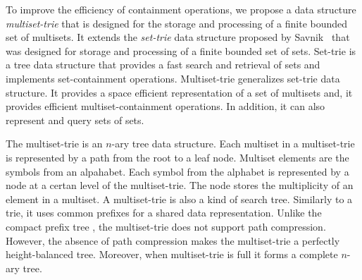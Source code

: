%
%
To improve the efficiency of containment operations, we propose a data structure \emph{multiset-trie} that is designed for the storage and processing of a finite bounded set of multisets. It extends the \emph{set-trie} data structure proposed by Savnik~\cite{savnik2013index} that was designed for storage and processing of a finite bounded set of sets. 
%
Set-trie is a tree data structure that provides a fast search and retrieval of sets and implements set-containment operations. Multiset-trie generalizes set-trie data structure. It provides a space efficient representation of a set of multisets and, it provides efficient multiset-containment operations. In addition, it can also represent and query sets of sets.

The multiset-trie is an $n$-ary tree data structure. Each multiset in a multiset-trie is represented by a path from the root to a leaf node. Multiset elements are the symbols from an alpahabet. Each symbol from the alphabet is represented by a node at a certan level of the multiset-trie. The node stores the multiplicity of an element in a multiset.
%
%
A multiset-trie is also a kind of search tree. Similarly to a trie, it uses common prefixes for a shared data representation. Unlike the compact prefix tree \cite{patriciaTree}, the multiset-trie does not support path compression. However, the absence of path compression makes the multiset-trie a perfectly height-balanced tree. Moreover, when multiset-trie is full it forms a complete $n$-ary tree.
%


